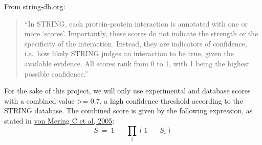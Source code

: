 From
\href{https://string-db.org/cgi/info.pl?footer_active_subpage=scores}{string-db.org}:

\begin{quote}
``In STRING, each protein-protein interaction is annotated with one or
more `scores'. Importantly, these scores do not indicate the strength or
the specificity of the interaction. Instead, they are indicators of
confidence, i.e.~how likely STRING judges an interaction to be true,
given the available evidence. All scores rank from 0 to 1, with 1 being
the highest possible confidence.''
\end{quote}

For the sake of this project, we will only use experimental and database
scores with a combined value \textgreater= 0.7, a high confidence
threshold according to the STRING database. The combined score is given
by the following expression, as stated in
\href{https://doi.org/10.1093/nar/gki005}{von Mering C et al, 2005}:
\[S\ =\ 1\ {-}\ {{\prod}_{i}}\left(1\ {-}\ S_{i}\right)\]

\begin{Shaded}
\end{Shaded}

